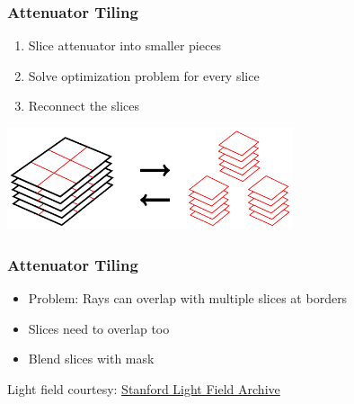 \documentclass[12pt, compress]{beamer}
\begin{document}
\begin{frame}[fragile]
	\frametitle{Attenuator Tiling}
	
	\begin{enumerate}[<alert@+>]
		\item Slice attenuator into smaller pieces
		\item Solve optimization problem for every slice
		\item Reconnect the slices
	\end{enumerate}
	
	\vspace{1cm}
	
	\begin{center}
		\includegraphics[height = 3cm]{figures/slicing_attenuator/tiling_overview.pdf}
	\end{center}
\end{frame}

\begin{frame}[fragile]
	\frametitle{Attenuator Tiling}

	\begin{itemize}
		\item Problem: Rays can overlap with multiple slices at borders
		\item Slices need to overlap too
		\item Blend slices with mask
	\end{itemize}
	
	\begin{figure}
		\hspace{1cm}
	\end{figure}
	
	{\scriptsize Light field courtesy: \href{http://lightfield.stanford.edu/lfs.html}{Stanford Light Field Archive}}
\end{frame}
\end{document}
